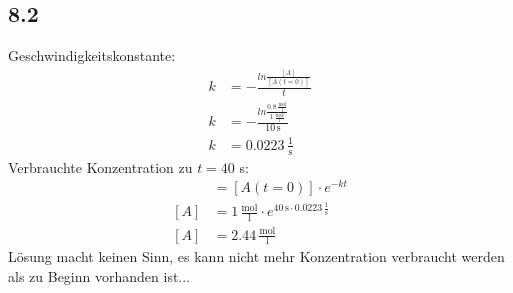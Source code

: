 \documentclass{article}
\begin{document}
\subsection*{8.2}
Geschwindigkeitskonstante:
\begin{align*}
    k &= - \frac{ln \frac{[A]}{[A(t=0)]}}{t}\\
    k &= - \frac{ln \frac{0.8\,\mathrm{\frac{mol}{l}}}{1\,\mathrm{\frac{mol}{l}}}}{10\,\mathrm{s}}\\
    k &= 0.0223\,\mathrm{\frac{1}{s}}
\end{align*}
Verbrauchte Konzentration zu $t= 40$ s:
\begin{align*}
    [A] &= [A(t=0)]\cdot e^{-kt}\\
    [A] &= 1\,\mathrm{\frac{mol}{l}} \cdot e^{40\,\mathrm{s} \cdot 0.0223\,\mathrm{\frac{1}{s}}}\\
    [A] &= 2.44\,\mathrm{\frac{mol}{l}}
\end{align*}
Lösung macht keinen Sinn, es kann nicht mehr Konzentration verbraucht werden als zu Beginn vorhanden ist...\\
\end{document}
